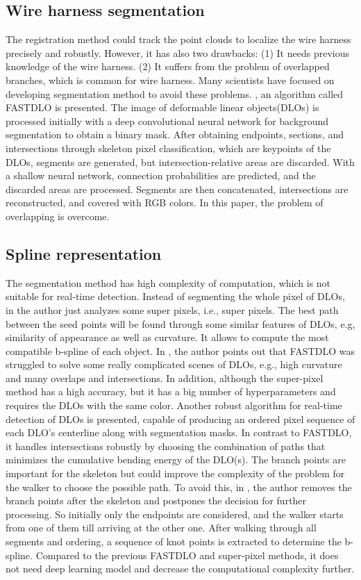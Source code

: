 \subsection{Wire harness segmentation}
    The registration method could track the point clouds to localize the wire harness precisely and robustly. However, it has also two drawbacks: (1) It needs previous knowledge of the 
    wire harness. (2) It suffers from the problem of overlapped branches, which is common for wire harness. Many scientists have focused on developing segmentation method to avoid these 
    problems. \cite{Caporali2022}, an algorithm called FASTDLO is presented. The image of deformable linear objects(DLOs) is processed initially with a deep convolutional neural network for background segmentation 
    to obtain a binary mask. After obtaining endpoints, sections, and intersections through skeleton pixel classification, which are keypoints of the DLOs, segments are generated, 
    but intersection-relative areas are discarded. With a shallow neural network, connection probabilities are predicted, and the discarded areas are processed. Segments are then 
    concatenated, intersections are reconstructed, and covered with RGB colors. In this paper, the problem of overlapping is overcome.
\subsection{Spline representation}
    The segmentation method has high complexity of computation, which is not suitable for real-time detection. Instead of segmenting the whole pixel of DLOs, in \cite{degregorio2018lets}
    the author just analyzes some super pixels, i.e., super pixels. The best path between the seed points will be found through some similar features of DLOs, e.g, similarity of appearance as well as 
    curvature. It allows to compute the most compatible b-spline of each object.
    In \cite{10167643}, the author points out that FASTDLO
    was struggled to solve some really complicated scenes of DLOs, e.g., high curvature and many overlaps and intersections. In addition, although the super-pixel method has a 
    high accuracy, but it has a big number of hyperparameters and requires the DLOs with the same color. Another robust algorithm 
    for real-time detection of DLOs is presented, capable of producing an ordered pixel sequence of each DLO’s centerline along with segmentation masks. In contrast to FASTDLO, it 
    handles intersections robustly by choosing the combination of paths that minimizes the cumulative bending energy of the DLO(s). The branch points are important for the skeleton 
    but could improve the complexity of the problem for the walker to choose the possible path. To avoid this, in \cite{10160437}, the author removes 
    the branch points after the skeleton and postpones the decision for further processing. So initially only the endpoints are considered, and the walker starts from one 
    of them till arriving at the other one. After walking through all segments and ordering, a sequence of knot points is extracted to determine the b-spline. Compared to the previous 
    FASTDLO and super-pixel methods, it does not need deep learning model and decrease the computational complexity further. 
